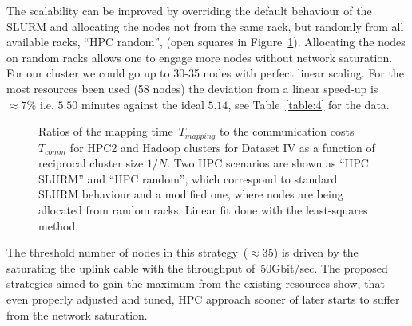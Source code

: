 \documentclass[11pt, oneside]{article}   	%
\begin{document}
The scalability can be improved by overriding the default behaviour of the SLURM and allocating the nodes not from the same rack, but randomly from all available racks, ``HPC random'', (open squares in Figure~\ref{fig:fig3}). Allocating the nodes on random racks allows one to engage more nodes without network saturation. For our cluster we could go up to 30-35 nodes with perfect linear scaling. For the most resources been used (58 nodes) the deviation from a linear speed-up is~$\approx 7\%$ i.e. $5.50$ minutes against the ideal $5.14$, see Table~\ref{table:4}  for the data.



\begin{figure}
	\small
	
	\normalsize
	\caption{Ratios of the mapping time~$T_{mapping}$ to the communication costs~$T_{comm}$ for HPC2 and Hadoop clusters for Dataset IV as a function of reciprocal cluster size $1/N$. Two HPC scenarios are shown as ``HPC SLURM'' and ``HPC random'', which correspond to standard SLURM behaviour and a modified one, where nodes are being allocated from random racks.
Linear fit  done with the least-squares method.}
	\label{fig:fig3}
\end{figure}

The threshold number of nodes in this strategy~($\approx35$) is driven by the saturating the uplink cable with the  throughput of~50Gbit/sec. 
The proposed strategies aimed to gain the maximum from the existing resources show, that even properly adjusted and tuned, HPC approach sooner of later starts to suffer from the network saturation.  
\end{document}
